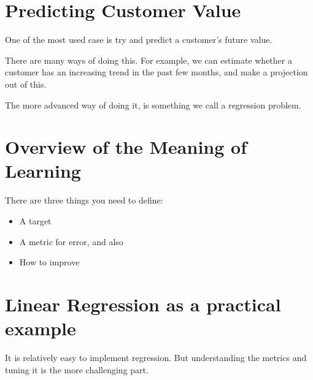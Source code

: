 \section{Predicting Customer Value}
\label{sec:05_cust_value}

One of the most used case is try and predict a customer's future value.  

There are many ways of doing this.  For example, we can estimate whether a customer has an increasing trend in the past few months, and make a projection out of this.  

The more advanced way of doing it, is something we call a regression problem.  

\section{Overview of the Meaning of Learning}

There are three things you need to define:

\begin{itemize}
\item A target 
\item A metric for error, and also
\item How to improve 
\end{itemize}

\section{Linear Regression as a practical example}

It is relatively easy to implement regression.  But understanding the metrics and tuning it is the more challenging part.  

\newpage